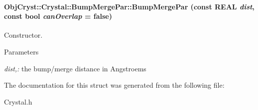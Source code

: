 \paragraph[{BumpMergePar}]{\setlength{\rightskip}{0pt plus 5cm}ObjCryst::Crystal::BumpMergePar::BumpMergePar (const REAL {\em dist}, \/  const bool {\em canOverlap} = {\ttfamily false})}\hfill\label{a00009_ac4da8697127de078e7ef7092c49de0ab}


Constructor. 
\begin{DoxyParams}{Parameters}
\item[{\em dist,:}]the bump/merge distance in Angstroems \end{DoxyParams}


The documentation for this struct was generated from the following file:\begin{DoxyCompactItemize}
\item 
Crystal.h\end{DoxyCompactItemize}
